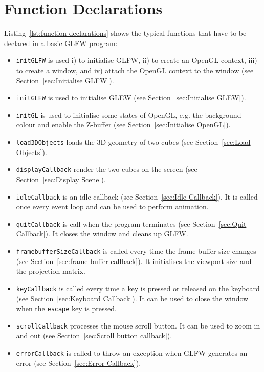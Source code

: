 \documentclass[11pt,oneside,a4paper,final]{article}
\begin{document}
\begin{center}

\end{center}


\section{Function Declarations}
\label{sec:Function Declarations}

Listing~\ref{lst:function declarations} shows the typical functions 
that have to be declared in a basic GLFW program:
\begin{itemize}
 \item \verb+initGLFW+ is used i) to initialise GLFW, ii) to create an OpenGL 
	context, iii) to create a window, and iv) attach the OpenGL context to the 
	window (see Section~\ref{sec:Initialise GLFW}).
 \item \verb+initGLEW+ is used to initialise GLEW (see 
	Section~\ref{sec:Initialise GLEW}).
 \item \verb+initGL+ is used to initialise some states of OpenGL, e.g. the 
	background colour and enable the Z-buffer (see 
	Section~\ref{sec:Initialise OpenGL}).
 \item \verb+load3DObjects+ loads the 3D geometry of two cubes (see 
	Section~\ref{sec:Load Objects}).
 \item \verb+displayCallback+ render the two cubes on the screen (see 
	Section~\ref{sec:Display Scene}).
 \item \verb+idleCallback+ is an idle callback 
	(see Section~\ref{sec:Idle Callback}). It is called once every event 
	loop and can be used to perform animation.
 \item \verb+quitCallback+ is call when the program terminates  (see 
	Section~\ref{sec:Quit Callback}). It closes the window and cleans up 
	GLFW.
 \item \verb+framebufferSizeCallback+ is called every time the frame buffer 
	size changes (see Section~\ref{sec:frame buffer callback}). It initialises 
	the viewport size and the projection matrix.
 \item \verb+keyCallback+ is called every time a key is pressed or released on 
	the keyboard (see Section~\ref{sec:Keyboard Callback}). It can be used to 
	close the window when the \verb+escape+ key is pressed.
\item \verb+scrollCallback+ processes the mouse scroll button. It can be used 
	to zoom in and out (see Section~\ref{sec:Scroll button callback}).
 \item \verb+errorCallback+ is called to throw an exception when GLFW generates 
	an error (see Section~\ref{sec:Error Callback}).
\end{itemize}
\end{document}
